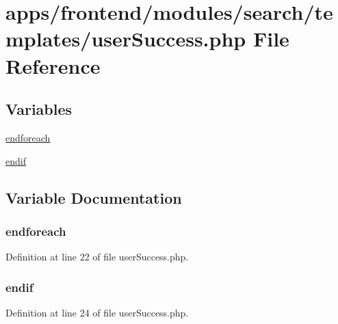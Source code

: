 \hypertarget{user_success_8php}{\section{apps/frontend/modules/search/templates/user\-Success.php File Reference}
\label{user_success_8php}
}
\subsection*{Variables}
\begin{DoxyCompactItemize}
\item 
\hyperlink{user_success_8php_a672d9707ef91db026c210f98cc601123}{endforeach}
\item 
\hyperlink{user_success_8php_a82cd33ca97ff99f2fcc5e9c81d65251b}{endif}
\end{DoxyCompactItemize}


\subsection{Variable Documentation}
\hypertarget{user_success_8php_a672d9707ef91db026c210f98cc601123}{
\subsubsection[{endforeach}]{\setlength{\rightskip}{0pt plus 5cm}endforeach}}\label{user_success_8php_a672d9707ef91db026c210f98cc601123}


Definition at line 22 of file user\-Success.\-php.

\hypertarget{user_success_8php_a82cd33ca97ff99f2fcc5e9c81d65251b}{
\subsubsection[{endif}]{\setlength{\rightskip}{0pt plus 5cm}endif}}\label{user_success_8php_a82cd33ca97ff99f2fcc5e9c81d65251b}


Definition at line 24 of file user\-Success.\-php.

